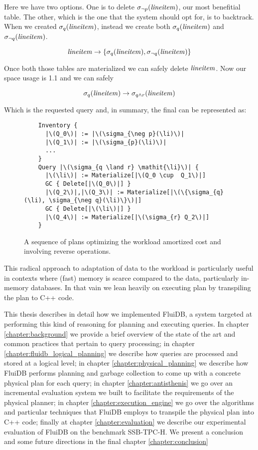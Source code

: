 Here we have two options. One is to delete \(\sigma_{\neg
  p}(\mathit{lineitem})\), our most benefitial table. The other, which is the one
that the system should opt for, is to backtrack. When we created
\(\sigma_{q}(\mathit{lineitem})\), instead we create both
\(\sigma_{q}(\mathit{lineitem})\) and \(\sigma_{\neg q}(\mathit{lineitem})\).

\[
  \mathit{lineitem} \rightarrow \{\sigma_{q}(\mathit{lineitem}), \sigma_{\neg q}(\mathit{lineitem})\}
\]

Once both those tables are materialized we can safely delete
\(\mathit{lineitem}\). Now our space usage is 1.1 and we can safely

\[
  \sigma_{q}(\mathit{lineitem}) \rightarrow \sigma_{q \land r} (\mathit{lineitem})
\]

Which is the requested query and, in summary, the final can be
represented as:


\begin{figure}[H]
\begin{verbatim}
    Inventory {
      |\(Q_0\)| := |\(\sigma_{\neg p}(\li)\)|
      |\(Q_1\)| := |\(\sigma_{p}(\li)\)|
      ...
    }
    Query |\(\sigma_{q \land r} \mathit{\li}\)| {
      |\(\li\)| := Materialize[|\(Q_0 \cup  Q_1\)|]
      GC { Delete[|\(Q_0\)|] }
      |\(Q_2\)|,|\(Q_3\)| := Materialize[|\(\{\sigma_{q}(\li), \sigma_{\neg q}(\li)\}\)|]
      GC { Delete[|\(\li\)|] }
      |\(Q_4\)| := Materialize[|\(\sigma_{r} Q_2\)|]
    }
\end{verbatim}
  \caption{\label{fig:reverse_operations}A sequence of plans optimizing
    the workload amortized cost and involving reverse operations.}
\end{figure}

This radical approach to adaptation of data to the workload is
particularly useful in contexts where (fast) memory is scarce compared
to the data, particularly in-memory databases. In that vain we lean
heavily on executing plan by transpiling the plan to C++ code.

This thesis describes in detail how we implemented FluiDB, a system
targeted at performing this kind of reasoning for planning and
executing queries. In chapter \ref{chapter:background} we provide a
brief overview of the state of the art and common practices that
pertain to query processing; in chapter
\ref{chapter:fluidb_logical_planning} we describe how queries are
processed and stored at a logical level; in chapter
\ref{chapter:physical_planning} we describe how FluiDB performs
planning and garbage collection to come up with a concrete physical
plan for each query; in chapter \ref{chapter:antisthenis} we go over
an incremental evaluation system we built to facilitate the
requirements of the physical planner; in chapter
\ref{chapter:execution_engine} we go over the algorithms and
particular techniques that FluiDB employs to transpile the physical
plan into C++ code; finally at chapter \ref{chapter:evaluation} we
describe our experimental evaluation of FluiDB on the benchmark
SSB-TPC-H. We present a conclusion and some future directions in the
final chapter \ref{chapter:conclusion}
